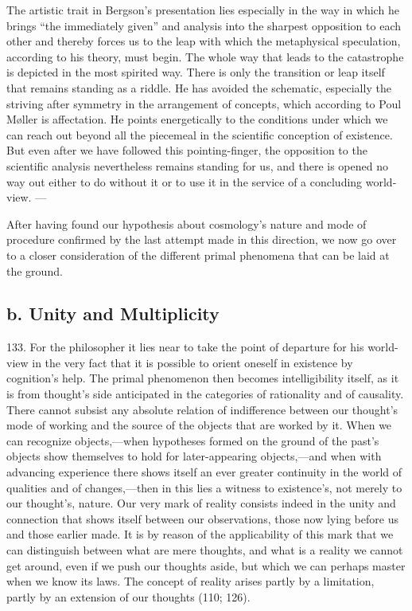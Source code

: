 \documentclass[12pt,a4paper]{book}
\newcommand{\opage}[1]{\marginnote{\footnotesize\textit{[#1]}}}
\begin{document}
The artistic trait in Bergson's presentation lies especially in the way in which he brings ``the
immediately given'' and analysis into the sharpest opposition to each other and thereby forces us to
the leap with which the metaphysical speculation, according to his theory, must begin. The whole way
that leads to the catastrophe is depicted in the most spirited way. There is only the transition or
leap itself that remains standing as a riddle. He has avoided the schematic, especially the striving
after symmetry in the arrangement of concepts, which according to Poul Møller is affectation. He points
energetically to the conditions under which we can reach out beyond all the piecemeal in the scientific
conception of existence. But even after we have followed this pointing-finger, the opposition to the
scientific analysis nevertheless remains standing for us, and there is opened no way out either to do
without it or to use it in the service of a concluding world-view. ---

After having found our hypothesis about cosmology's nature and mode of procedure confirmed by the last
attempt made in this direction, we now go over to a closer consideration of the different primal
phenomena that can be laid at the ground.

\subsection*{b. Unity and Multiplicity}

133. For the philosopher \opage{319}it lies near to take the point of departure for his world-view in the
very fact that it is possible to orient oneself in existence by cognition's help. The primal
phenomenon then becomes intelligibility itself, as it is from thought's side anticipated in the
categories of rationality and of causality. There cannot subsist any absolute relation of
indifference between our thought's mode of working and the source of the objects that are worked
by it. When we can recognize objects,---when hypotheses formed on the ground of the past's objects
show themselves to hold for later-appearing objects,---and when with advancing experience there
shows itself an ever greater continuity in the world of qualities and of changes,---then in this
lies a witness to existence's, not merely to our thought's, nature. Our very mark of reality
consists indeed in the unity and connection that shows itself between our observations, those now
lying before us and those earlier made. It is by reason of the applicability of this mark that we
can distinguish between what are mere thoughts, and what is a reality we cannot get around, even if
we push our thoughts aside, but which we can perhaps master when we know its laws. The concept of
reality arises partly by a limitation, partly by an extension of our thoughts (110; 126).
\end{document}
